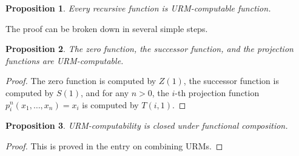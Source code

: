 \documentclass[12pt]{article}
\newtheorem{prop}{Proposition}
\begin{document}
\begin{prop}  Every recursive function is URM-computable function. \end{prop}

The proof can be broken down in several simple steps.

\begin{prop} The zero function, the successor function, and the projection functions are URM-computable.  \end{prop}
\begin{proof}  The zero function is computed by $Z(1)$, the successor function is computed by $S(1)$, and for any $n>0$, the $i$-th projection function $p_i^n(x_1,\ldots,x_n)=x_i$ is computed by $T(i,1)$.
\end{proof}

\begin{prop} URM-computability is closed under functional composition. \end{prop}
\begin{proof} This is proved in the entry on combining URMs. \end{proof}
\end{document}
